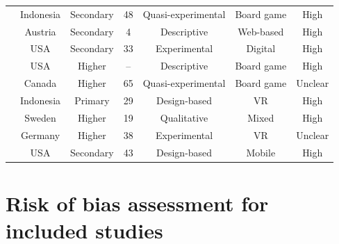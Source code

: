 \documentclass[a4paper,fleqn]{cas-sc}
\begin{document}
\begin{longtable}{|p{4.6cm}|c|c|c|c|c|c|}
\citet{72hutauruk2020utilization} &  Indonesia & Secondary & 48 & Quasi-experimental & Board game & High \\
\citet{73Wolfartsberger2011160} &  Austria & Secondary & 4 & Descriptive & Web-based & High \\
\citet{74Fendt2019} & USA & Secondary & 33 & Experimental & Digital & High \\
\citet{75trajano2014using} & USA & Higher & -- & Descriptive & Board game & High \\
\citet{76Corbeil2011462} & Canada & Higher & 65 & Quasi-experimental & Board game & Unclear \\
\citet{77Ramansyah2021} &  Indonesia & Primary & 29 & Design-based & VR & High \\
\citet{78Rouse2022357} & Sweden & Higher & 19 & Qualitative & Mixed & High \\
\citet{79Fernes2024379} & Germany & Higher & 38 & Experimental & VR & Unclear \\
\citet{80gottlieb2018your} & USA & Secondary & 43 & Design-based & Mobile & High \\

\end{longtable}

\pagebreak
\section{Risk of bias assessment for included studies}
\end{document}
